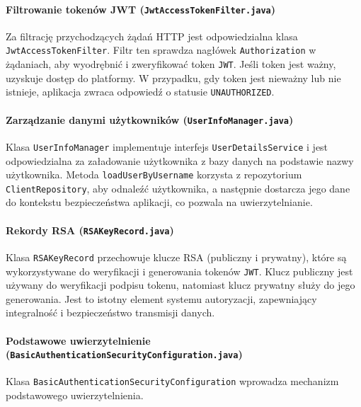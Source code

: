\paragraph{Filtrowanie tokenów JWT (\texttt{JwtAccessTokenFilter.java})} 
Za filtrację przychodzących żądań HTTP jest odpowiedzialna klasa \texttt{JwtAccessTokenFilter}. Filtr ten sprawdza nagłówek \texttt{Authorization} w żądaniach, aby wyodrębnić i zweryfikować token \texttt{JWT}. Jeśli token jest ważny, uzyskuje dostęp do platformy. W przypadku, gdy token jest nieważny lub nie istnieje, aplikacja zwraca odpowiedź o statusie \texttt{UNAUTHORIZED}.

\paragraph{Zarządzanie danymi użytkowników (\texttt{UserInfoManager.java})} 
Klasa \texttt{UserInfoManager} implementuje interfejs \texttt{UserDetailsService} i jest odpowiedzialna za załadowanie użytkownika z bazy danych na podstawie nazwy użytkownika. Metoda \texttt{loadUserByUsername} korzysta z repozytorium \texttt{ClientRepository}, aby odnaleźć użytkownika, a następnie dostarcza jego dane do kontekstu bezpieczeństwa aplikacji, co pozwala na uwierzytelnianie.

\paragraph{Rekordy RSA (\texttt{RSAKeyRecord.java})} 
Klasa \texttt{RSAKeyRecord} przechowuje klucze RSA (publiczny i prywatny), które są wykorzystywane do weryfikacji i generowania tokenów \texttt{JWT}. Klucz publiczny jest używany do weryfikacji podpisu tokenu, natomiast klucz prywatny służy do jego generowania. Jest to istotny element systemu autoryzacji, zapewniający integralność i bezpieczeństwo transmisji danych.

\paragraph{Podstawowe uwierzytelnienie (\texttt{BasicAuthenticationSecurityConfiguration.java})
} 
Klasa \texttt{BasicAuthenticationSecurityConfiguration} wprowadza mechanizm podstawowego uwierzytelnienia.
	
